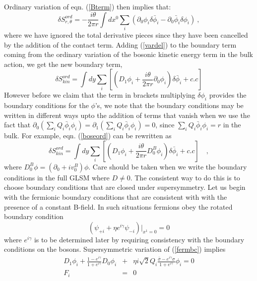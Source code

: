 \documentclass[a4paper,12pt]{article}
\begin{document}
Ordinary variation of eqn. (\ref{Bterm}) then implies that:
\begin{equation}
\delta S^{ord}_{r,\theta}=-\frac{i\theta}{2\pi r}\int dx^0
\sum_i\left(\partial_0 \phi_i\delta{\bar \phi_i}-
\partial_0
{\bar \phi_i}\delta\phi_i\right)\ ,
\label{vardel}
\end{equation}
where we have ignored the total derivative pieces 
since they have been cancelled by the addition of the contact
term. 
Adding (\ref{vardel}) to the boundary term coming from the ordinary 
variation of the bosonic kinetic energy term in the bulk action, 
we get the new boundary term,
\begin{equation}
\delta S^{ord}_{kin}=\int dy\sum_i\left[\left(D_1\phi_i
+\frac{i\theta}{2\pi r}\partial_0
\phi_i\right)\delta{\bar \phi_i}+c.c\right]
\label{boseord}
\end{equation}
However before we claim that the term in brackets multiplying
$\delta\phi_i$ provides the boundary conditions for the $\phi$'s, 
we note that the boundary conditions may be written in different
ways upto the addition of terms that vanish when we use the fact that
$\partial_0\left(
\sum_iQ_i{\bar \phi_i}\phi_i\right)=\partial_1\left(
\sum_iQ_i{\bar \phi_i}\phi_i\right)=0$, since $\sum_iQ_i{\bar \phi_i}
\phi_i=r$ in the bulk.
For example, eqn. (\ref{boseord}) can be rewritten as
\begin{equation}
\delta S^{ord}_{kin}=\int dy\sum_i\left[\left(D_1\phi_i
+\frac{i\theta}{2\pi r}D^B_0
\phi_i\right)\delta{\bar \phi_i}+c.c\right]\quad,
\label{boseord1}
\end{equation}
where $D_0^B\phi = (\partial_0 +i v_0^B) \phi$.
Care should be taken when we write the boundary conditions
in the full GLSM where $D\neq0$.
The consistent way to do this is to choose boundary
conditions that are closed under supersymmetry. 
Let us begin with the fermionic boundary conditions that are consistent with
with the presence of a constant B-field. 
In such situations fermions obey the rotated boundary condition
\begin{equation}
(\psi_{+i}+\eta e^{i\gamma}\psi_{-i})|_{x^1=0}=0
\label{fermbc}
\end{equation}
where $e^{i\gamma}$ is to be determined later by requiring consistency
with the boundary conditions on the bosons.
Supersymmetric variation of (\ref{fermbc}) implies 
\begin{eqnarray}
D_1\phi_i+\frac{1-e^{i\gamma}}{1+e^{i\gamma}}D_0\phi_i&+&\eta i{\sqrt 2}
Q_i\frac{{\bar \sigma}-e^{i\gamma}\sigma}{1+e^{i\gamma}}\phi_i=0
\label{bosebc}\\
F_i&=&0
\label{supervary}
\end{eqnarray}
\end{document}
